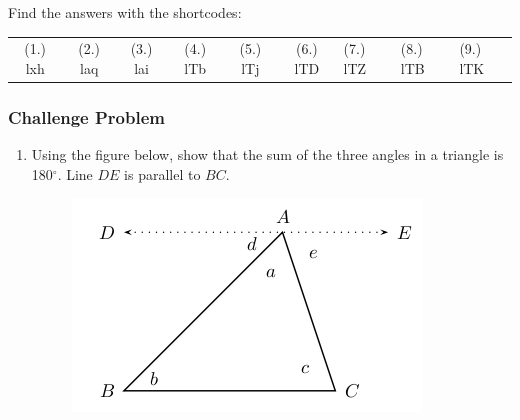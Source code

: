       \label{m39368*uid132}
\par {} Find the answers with the shortcodes:
 \par \begin{tabular}[h]{cccccc}
 (1.) lxh  &  (2.) laq  &  (3.) lai  &  (4.) lTb  &  (5.) lTj  &  (6.) lTD  &  (7.) lTZ  &  (8.) lTB  &  (9.) lTK  & \end{tabular}



            \subsubsection{ Challenge Problem}
            \nopagebreak
            
        
        \label{m39368*id320611}\begin{enumerate}[noitemsep, label=\textbf{\arabic*}. ] 
            \label{m39368*uid133}\item Using the figure below, show that the sum of the three angles in a triangle is 180\begin{math}{}^{\circ }\end{math}. Line \begin{math}DE\end{math}\hspace{1ex} is parallel to \begin{math}BC\end{math}.

    \setcounter{subfigure}{0}


	\begin{figure}[H] %
    \begin{center}
    \label{m39368*id320668!!!underscore!!!media}\label{m39368*id320668!!!underscore!!!printimage}\includegraphics{col11306.imgs/m39368_MG10C13_065.png} %
        
      \vspace{2pt}
    \vspace{.1in}
    
    \end{center}

 \end{figure}   

    \addtocounter{footnote}{-0}
    \newline
            \end{enumerate}
        

